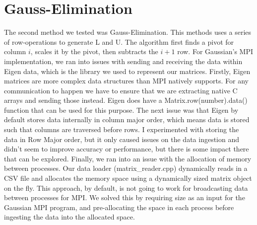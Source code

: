 \documentclass[12pt,letterpaper]{article}
\begin{document}
\section*{Gauss-Elimination}
The second method we tested was Gauss-Elimination. This methods uses a series of row-operations to generate L and U.  The algorithm first finds a pivot for column \(i\), scales it by the pivot, then subtracts the \(i+1\) row. For Gaussian's MPI implementation, we ran into issues with sending and receiving the data within Eigen data, which is the library we used to represent our matrices. Firstly, Eigen matrices are more complex data structures than MPI natively supports. For any communication to happen we have to ensure that we are extracting native C arrays and sending those instead. Eigen does have a Matrix.row(number).data() function that can be used for this purpose. The next issue was that Eigen by default stores data internally in column major order, which means data is stored such that columns are traversed before rows. I experimented with storing the data in Row Major order, but it only caused issues on the data ingestion and didn't seem to improve accuracy or performance, but there is some impact there that can be explored. Finally, we ran into an issue with the allocation of memory between processes. Our data loader (matrix\_reader.cpp) dynamically reads in a CSV file and allocates the memory space using a dynamically sized matrix object on the fly. This approach, by default, is not going to work for broadcasting data between processes for MPI. We solved this by requiring size as an input for the Gaussian MPI program, and pre-allocating the space in each process before ingesting the data into the allocated space.
\end{document}
